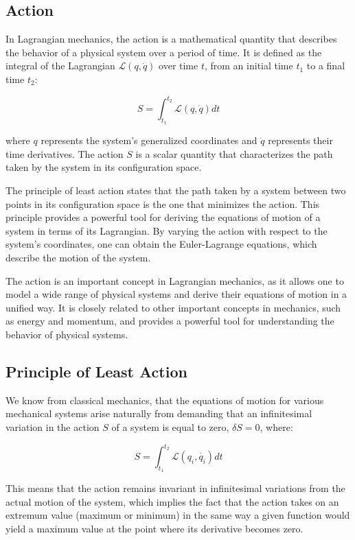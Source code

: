 \documentclass[12pt, a4paper]{article} %
\begin{document}
\subsection{Action}

In Lagrangian mechanics, the action is a mathematical quantity that describes the behavior of a physical system over a period of time. It is defined as the integral of the Lagrangian $\mathscr{L}(q, \dot{q})$ over time $t$, from an initial time $t_1$ to a final time $t_2$:

\[S = \int_{t_1}^{t_2} \mathscr{L}(q, \dot{q}) dt\]

where $q$ represents the system's generalized coordinates and $\dot{q}$ represents their time derivatives. The action $S$ is a scalar quantity that characterizes the path taken by the system in its configuration space.

The principle of least action states that the path taken by a system between two points in its configuration space is the one that minimizes the action. This principle provides a powerful tool for deriving the equations of motion of a system in terms of its Lagrangian. By varying the action with respect to the system's coordinates, one can obtain the Euler-Lagrange equations, which describe the motion of the system.

The action is an important concept in Lagrangian mechanics, as it allows one to model a wide range of physical systems and derive their equations of motion in a unified way. It is closely related to other important concepts in mechanics, such as energy and momentum, and provides a powerful tool for understanding the behavior of physical systems.

\subsection{Principle of Least Action}
We know from classical mechanics, that the equations of motion for various mechanical systems arise naturally from demanding that an infinitesimal variation in the action  $S$
of a system is equal to zero,  $\delta S=0$, where:

\BgThispage

\begin{equation*}
    S = \int_{t_1}^{t_2}\mathscr{L}\left(q_i, \dot{q_i}\right)dt 
\end{equation*}

This means that the action remains invariant in infinitesimal variations from the actual motion of the system, which implies the fact that the action takes on an extremum value (maximum or minimum) in the same way a given function would yield a maximum value at the point where its derivative becomes zero.
\end{document}
